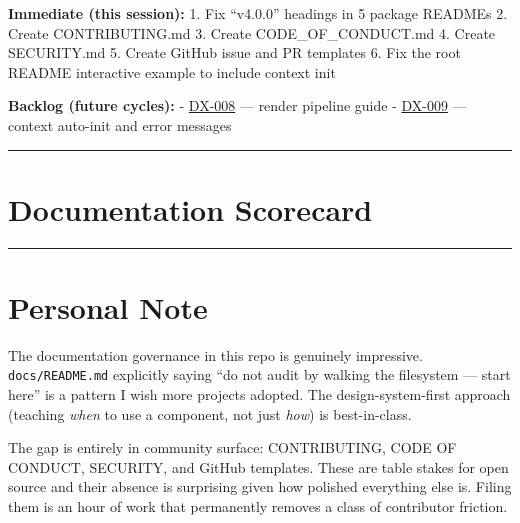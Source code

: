 \textbf{Immediate (this session):} 1. Fix ``v4.0.0'' headings in 5 package READMEs 2. Create CONTRIBUTING.md 3. Create CODE\_OF\_CONDUCT.md 4. Create SECURITY.md 5. Create GitHub issue and PR templates 6. Fix the root README interactive example to include context init

\textbf{Backlog (future cycles):} - \href{https://github.com/flyingrobots/bijou/blob/cbd70612140e7a450d764b3c7be1c6af878b99bc/docs/method/graveyard/legacy-backlog/inbox/DX-008-render-pipeline-guide.md}{DX-008} --- render pipeline guide - \href{https://github.com/flyingrobots/bijou/blob/cbd70612140e7a450d764b3c7be1c6af878b99bc/docs/method/graveyard/legacy-backlog/inbox/DX-009-context-auto-init-and-error-messages.md}{DX-009} --- context auto-init and error messages

\begin{center}\rule{0.5\linewidth}{0.5pt}\end{center}

\section{Documentation Scorecard}\label{record-412-documentation-scorecard}



\begin{center}\rule{0.5\linewidth}{0.5pt}\end{center}

\section{Personal Note}\label{record-412-personal-note}

The documentation governance in this repo is genuinely impressive. \texttt{d\allowbreak{}o\allowbreak{}c\allowbreak{}s\allowbreak{}/\allowbreak{}R\allowbreak{}E\allowbreak{}A\allowbreak{}D\allowbreak{}M\allowbreak{}E\allowbreak{}.\allowbreak{}m\allowbreak{}d} explicitly saying ``do not audit by walking the filesystem --- start here'' is a pattern I wish more projects adopted. The design-system-first approach (teaching \emph{when} to use a component, not just \emph{how}) is best-in-class.

The gap is entirely in community surface: CONTRIBUTING, CODE OF CONDUCT, SECURITY, and GitHub templates. These are table stakes for open source and their absence is surprising given how polished everything else is. Filing them is an hour of work that permanently removes a class of contributor friction.

